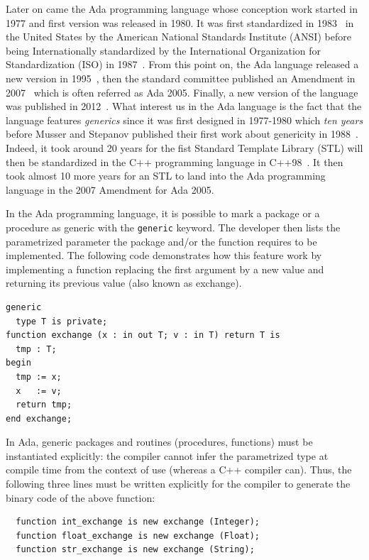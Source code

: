 Later on came the Ada programming language whose conception work started in 1977 and first version was released in 1980.
It was first standardized in 1983~\parencite{ansi.1983.ada} in the United States by the American National Standards
Institute (ANSI) before being Internationally standardized by the International Organization for Standardization (ISO)
in 1987~\parencite{iso.1987.ada}. From this point on, the Ada language released a new version in
1995~\parencite{iso.1995.ada, iso.1995.ada.corr}, then the standard committee published an Amendment in
2007~\parencite{iso.1995.ada.amend} which is often referred as Ada 2005. Finally, a new version of the language was
published in 2012~\parencite{iso.2012.ada,iso.2012.ada.corr}. What interest us in the Ada language is the fact that the
language features \emph{generics} since it was first designed in 1977-1980 which \emph{ten years} before Musser and
Stepanov published their first work about genericity in 1988~\parencite{musser.1988.generic}. Indeed, it took around 20
years for the fist Standard Template Library (STL) will then be standardized in the C++ programming language in
C++98~\parencite{iso.1998.cpp}. It then took almost 10 more years for an STL to land into the Ada programming language in
the 2007 Amendment for Ada 2005.

In the Ada programming language, it is possible to mark a package or a procedure as generic with the \texttt{generic}
keyword. The developer then lists the parametrized parameter the package and/or the function requires to be implemented.
The following code demonstrates how this feature work by implementing a function replacing the first argument by a new
value and returning its previous value (also known as exchange).

\begin{verbatim}
generic
  type T is private;
function exchange (x : in out T; v : in T) return T is
  tmp : T;
begin
  tmp := x;
  x   := v;
  return tmp;
end exchange;
\end{verbatim}

In Ada, generic packages and routines (procedures, functions) must be instantiated explicitly: the compiler cannot infer
the parametrized type at compile time from the context of use (whereas a C++ compiler can). Thus, the following three
lines must be written explicitly for the compiler to generate the binary code of the above function:
\begin{verbatim}
  function int_exchange is new exchange (Integer);
  function float_exchange is new exchange (Float);
  function str_exchange is new exchange (String);
\end{verbatim}

